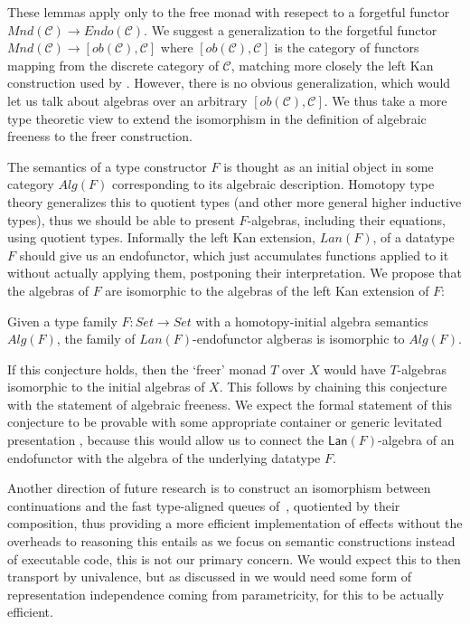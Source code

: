 \documentclass[preprint,sigplan]{acmart}
\begin{document}
These lemmas apply only to the free monad with resepect to a forgetful functor
$Mnd(\mathcal{C}) \rightarrow Endo(\mathcal{C})$. We suggest a
generalization to the forgetful functor $Mnd(\mathcal{C}) \rightarrow
[ob(\mathcal{C}),\mathcal{C}]$ where $[ob(\mathcal{C}),\mathcal{C}]$ is the category of functors mapping from
the discrete category of $\mathcal{C}$, matching more closely the left
Kan construction used by . %
However,
there is no obvious generalization, which would let us talk about
algebras over an arbitrary $[ob(\mathcal{C}),\mathcal{C}]$. We thus
take a more type theoretic view to
extend the isomorphism in the definition of algebraic freeness to the freer construction.

The semantics of a type constructor $F$ is thought as an initial
object in some category $Alg(F)$ corresponding to its algebraic description.
Homotopy type theory generalizes this to quotient types (and other more general higher
inductive types), thus we should be able to present $F$-algebras, including their equations, using quotient types.
Informally the left Kan extension, $Lan(F)$, of a datatype $F$ should give us an endofunctor, which just accumulates functions applied to it
without actually applying them, postponing their interpretation.
We propose that
the algebras of $F$ are isomorphic to the algebras of the left Kan extension of $F$:
%
\begin{conjecture}
Given a type family $F : Set \rightarrow Set$ with a homotopy-initial algebra semantics $Alg(F)$, the family of $Lan(F)$-endofunctor algberas is isomorphic to $Alg(F)$.
\end{conjecture}
%
If this conjecture holds, then the `freer' monad $T$ over $X$ would have $T$-algebras isomorphic to the initial algebras of $X$.
This follows by chaining this conjecture with the statement of algebraic freeness.
We expect the formal statement of this conjecture to be provable
with some appropriate container \cite{altenkirch2015indexed} or generic levitated presentation \cite{DBLP:conf/icfp/ChapmanDMM10},
because this would allow us to connect the $\mathsf{Lan}(F)$-algebra of an endofunctor with the algebra of the underlying datatype $F$.

Another direction of future research is to construct an isomorphism between continuations and the fast type-aligned queues of~\citet{ploeg2014reflection,freerm}, quotiented by their composition,
thus providing a more efficient implementation of effects without the overheads to reasoning this entails as we focus on semantic constructions instead of executable code, this is not our primary concern.
We would expect this to then transport by univalence, but as discussed
in \cite{unitransport} we would need some form of representation
independence coming from parametricity, for this to be actually
efficient.
\end{document}
